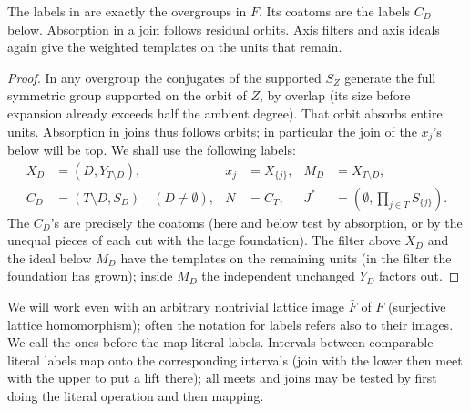 \begin{lemma}\label{t:weighted-labels}
The labels in  are exactly the overgroups in \(F\).
Its coatoms are the labels \(C_D\) below.  Absorption in a join follows residual
orbits.  Axis filters and axis ideals again give the weighted templates on the
units that remain.
\end{lemma}
\begin{proof}
In any overgroup the conjugates of the supported \(S_Z\) generate the full symmetric group
supported on the orbit of \(Z\), by overlap (its size before expansion already exceeds half the
ambient degree). That orbit absorbs entire units. Absorption in joins thus follows orbits; in
particular the join of the \(x_j\)'s below will be top. We shall use the following labels:
\begin{align*}
 X_D&=(D,Y_{T\setminus D}), & x_j&=X_{\{j\}}, & M_D&=X_{T\setminus D},\\
 C_D&=(T\setminus D,S_D)\quad(D\ne\emptyset),& N&=C_T,
 & J^*&=(\emptyset,\prod_{j\in T}S_{\{j\}}).
\end{align*}
The \(C_D\)'s are precisely the coatoms (here and below test by absorption, or by the unequal
pieces of each cut with the large foundation). The filter above \(X_D\) and the ideal below
\(M_D\) have the templates on the remaining units (in the filter the foundation has grown); inside
\(M_D\) the independent unchanged \(Y_D\) factors out.
\end{proof}

\begin{convention}\label{t:weighted-images}
We will work even with an arbitrary nontrivial lattice image \(\bar F\) of \(F\) (surjective
lattice homomorphism); often the notation for labels refers also to their images. We call the ones
before the map literal labels. Intervals between comparable literal labels map onto the
corresponding intervals (join with the lower then meet with the upper to put a lift there); all
meets and joins may be tested by first doing the literal operation and then mapping.
\end{convention}

